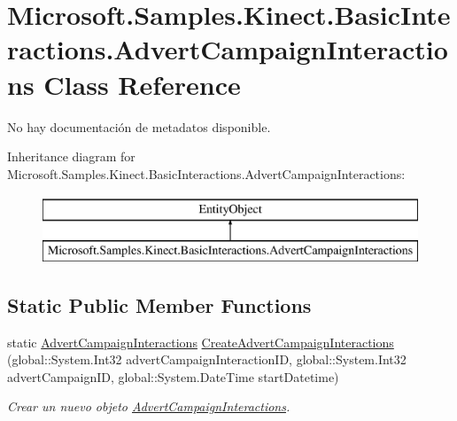 \hypertarget{class_microsoft_1_1_samples_1_1_kinect_1_1_basic_interactions_1_1_advert_campaign_interactions}{\section{Microsoft.\-Samples.\-Kinect.\-Basic\-Interactions.\-Advert\-Campaign\-Interactions Class Reference}
\label{class_microsoft_1_1_samples_1_1_kinect_1_1_basic_interactions_1_1_advert_campaign_interactions}
}


No hay documentación de metadatos disponible.  


Inheritance diagram for Microsoft.\-Samples.\-Kinect.\-Basic\-Interactions.\-Advert\-Campaign\-Interactions\-:\begin{figure}[H]
\begin{center}
\leavevmode
\includegraphics[height=2.000000cm]{class_microsoft_1_1_samples_1_1_kinect_1_1_basic_interactions_1_1_advert_campaign_interactions}
\end{center}
\end{figure}
\subsection*{Static Public Member Functions}
\begin{DoxyCompactItemize}
\item 
static \hyperlink{class_microsoft_1_1_samples_1_1_kinect_1_1_basic_interactions_1_1_advert_campaign_interactions}{Advert\-Campaign\-Interactions} \hyperlink{class_microsoft_1_1_samples_1_1_kinect_1_1_basic_interactions_1_1_advert_campaign_interactions_a47183aa29be95ae512121a63b472fc88}{Create\-Advert\-Campaign\-Interactions} (global\-::\-System.\-Int32 advert\-Campaign\-Interaction\-I\-D, global\-::\-System.\-Int32 advert\-Campaign\-I\-D, global\-::\-System.\-Date\-Time start\-Datetime)
\begin{DoxyCompactList}\small\item\em Crear un nuevo objeto \hyperlink{class_microsoft_1_1_samples_1_1_kinect_1_1_basic_interactions_1_1_advert_campaign_interactions}{Advert\-Campaign\-Interactions}. \end{DoxyCompactList}\end{DoxyCompactItemize}
